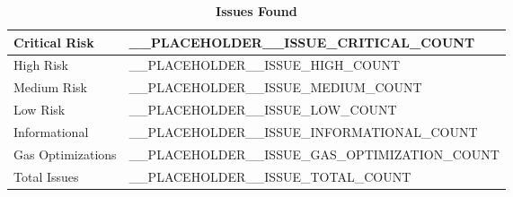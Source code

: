\begin{table}[H]
  \centering
  \caption*{\textbf{Issues Found}}
  \begin{tabular}{|p{4cm}|p{2cm}|}
    \hline
    Critical Risk & __PLACEHOLDER__ISSUE_CRITICAL_COUNT \\
    \hline
    High Risk & __PLACEHOLDER__ISSUE_HIGH_COUNT \\
    \hline
    Medium Risk & __PLACEHOLDER__ISSUE_MEDIUM_COUNT \\ 
    \hline
    Low Risk & __PLACEHOLDER__ISSUE_LOW_COUNT \\
    \hline
    Informational & __PLACEHOLDER__ISSUE_INFORMATIONAL_COUNT \\
    \hline
    Gas Optimizations & __PLACEHOLDER__ISSUE_GAS_OPTIMIZATION_COUNT \\ 
    \hline
    Total Issues & __PLACEHOLDER__ISSUE_TOTAL_COUNT \\
    \hline
  \end{tabular}
\end{table}

\renewcommand{\floatpagefraction}{.5}%
\renewcommand{\textfraction}{.2}%
\renewcommand{\topfraction}{.7}%
\renewcommand{\bottomfraction}{.3}%
\setcounter{topnumber}{2}
\setcounter{bottomnumber}{1}
\setcounter{totalnumber}{3}
